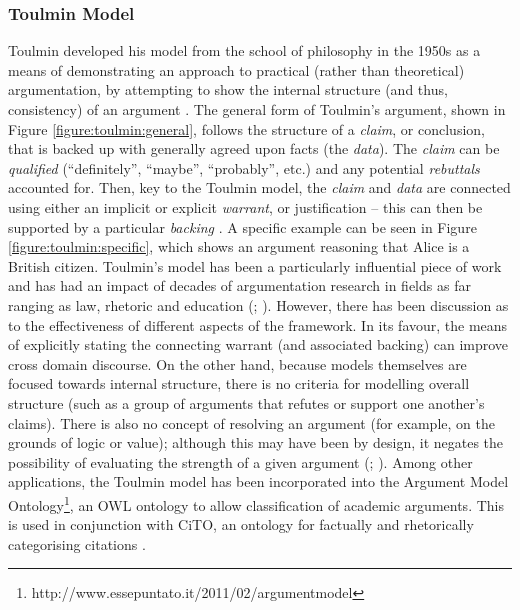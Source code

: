 \subsubsection{Toulmin Model}
Toulmin developed his model from the school of philosophy in the 1950s as a means of demonstrating an approach to practical (rather than theoretical) argumentation, by attempting to show the internal structure (and thus, consistency) of an argument \citep{Toulmin1958}. The general form of Toulmin's argument, shown in Figure \ref{figure:toulmin:general}, follows the structure of a \textit{claim}, or conclusion, that is backed up with generally agreed upon facts (the \textit{data}). The \textit{claim} can be \textit{qualified} (``definitely'', ``maybe'', ``probably'', etc.) and any potential \textit{rebuttals} accounted for. Then, key to the Toulmin model, the \textit{claim} and \textit{data} are connected using either an implicit or explicit \textit{warrant}, or justification -- this can then be supported by a particular \textit{backing} \citep[p.~347-350]{Verheij2005}. A specific example can be seen in Figure \ref{figure:toulmin:specific}, which shows an argument reasoning that Alice is a British citizen. Toulmin's model has been a particularly influential piece of work and has had an impact of decades of argumentation research  in fields as far ranging as law, rhetoric and education (\citealp[p.~8-10]{Newman1992}; \citealp[p.~5, 12]{Schneider2013}). However, there has been discussion as to the effectiveness of different aspects of the framework. In its favour, the means of explicitly stating the connecting warrant (and associated backing) can improve cross domain discourse. On the other hand, because models themselves are focused towards internal structure, there is no criteria for modelling overall structure (such as a group of arguments that refutes or support one another's claims). There is also no concept of resolving an argument (for example, on the grounds of logic or value); although this may have been by design, it negates the possibility of evaluating the strength of a given argument (\citealp[p.~349-350]{Newman1992}; \citealp[p.~5, 12]{Verheij2005}). Among other applications, the Toulmin model has been incorporated into the Argument Model Ontology\footnote{http://www.essepuntato.it/2011/02/argumentmodel}, an OWL ontology to allow classification of academic arguments. This is used in conjunction with CiTO, an ontology for factually and rhetorically categorising citations \citep[p.~8]{Peroni2012}.



